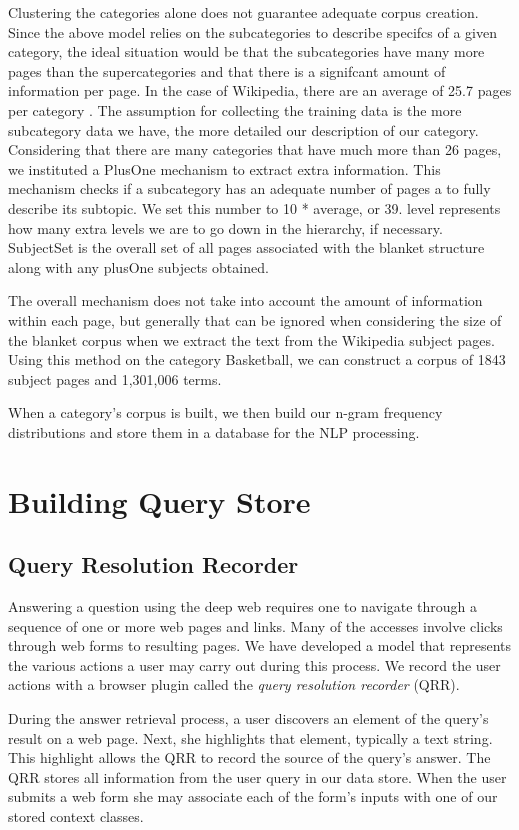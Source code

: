 \documentclass{www2010-submission}
\begin{document}
Clustering the categories alone does not guarantee adequate corpus creation. Since the above model relies on the subcategories to describe specifcs of a given category, the ideal situation would be that the subcategories have many more pages than the supercategories and that there is a signifcant amount of information per page. In the case of Wikipedia, there are an average of 25.7 pages per category \cite{1321474}. The assumption for collecting the training data is the more subcategory data we have, the more detailed our description of our category. Considering that there are many categories that have much more than 26 pages, we instituted a PlusOne mechanism to extract extra information. This mechanism checks if a subcategory has an adequate number of pages a to fully describe its subtopic. We set this number to 10 * average, or 39. level represents how many extra levels we are to go down in the hierarchy, if necessary. SubjectSet is the overall set of all pages associated with the blanket structure along with any plusOne subjects obtained.


The overall mechanism does not take into account the amount of information within each page, but generally that can be ignored when considering the size of the blanket corpus when we extract the text from the Wikipedia subject pages. Using this method on the category Basketball, we can construct a corpus of 1843 subject pages and 1,301,006 terms.

When a category's corpus is built, we then build our n-gram frequency distributions and store them in a database for the NLP processing.


\section{Building Query Store}
\subsection{Query Resolution Recorder}
Answering a question using the deep web requires one to navigate through a sequence of one or more web pages and links.  Many of the accesses involve clicks through web forms to resulting pages.  We have developed a model that represents the various actions a user may carry out during this process.  We record the user actions with a browser plugin called the \emph{query resolution recorder} (QRR).

During the answer retrieval process, a user discovers an element of the query's result on a web page.  Next, she highlights that element, typically a text string.  This highlight allows the QRR to record the source of  the query's answer.  The QRR stores all information from the user query in our data store.  When the user submits a web form she may associate each of the form's inputs with one of our stored context classes. 
\end{document}
